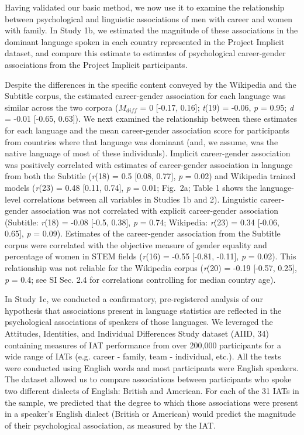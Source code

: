 \documentclass[9pt,twocolumn]{pnas-new}
\begin{document}
Having validated our basic method, we now use it to examine the relationship
between psychological and linguistic associations of men with career and women with family. In Study 1b, we
estimated the magnitude of these associations in the dominant language
spoken in each country represented in the Project Implicit dataset, and
compare this estimate to estimates of psychological career-gender associations from the
Project Implicit participants.



Despite the differences in the specific content conveyed by the
Wikipedia and the Subtitle corpus, the estimated career-gender association for each
language was similar across the two corpora ($M_{diff}$ = 0 {[}-0.17, 0.16{]}; \emph{t}(19) = -0.06, \emph{p} = 0.95; \emph{d} = -0.01 {[}-0.65, 0.63{]}). We next examined the relationship between these
estimates for each language and the mean career-gender association score
for participants from countries where that language was dominant (and,
we assume, was the native language of most of these individuals).
Implicit career-gender association was positively correlated with estimates of
 career-gender association in language from both the Subtitle (\emph{r}(18) = 0.5 {[}0.08, 0.77{]}, \emph{p} = 0.02)
and Wikipedia trained models (\emph{r}(23) = 0.48 {[}0.11, 0.74{]}, \emph{p} = 0.01; Fig.\ 2a;
Table 1 shows the language-level correlations between all variables in
Studies 1b and 2). Linguistic career-gender association was
not correlated with explicit career-gender association (Subtitle: \emph{r}(18) = -0.08 {[}-0.5, 0.38{]}, \emph{p} = 0.74; Wikipedia: \emph{r}(23) = 0.34 {[}-0.06, 0.65{]}, \emph{p} = 0.09). Estimates
of the career-gender association from the Subtitle corpus were correlated with the
objective measure of gender equality and percentage of women in STEM fields
(\emph{r}(16) = -0.55 {[}-0.81, -0.11{]}, \emph{p} = 0.02). This relationship was not reliable
for the Wikipedia corpus (\emph{r}(20) = -0.19 {[}-0.57, 0.25{]}, \emph{p} = 0.4; see SI Sec. 2.4 for correlations controlling for median country age). 




In Study 1c, we conducted a confirmatory, pre-registered analysis of our hypothesis that associations present in language statistics are reflected in the psychological associations of speakers of those languages. We leveraged the Attitudes, Identities, and Individual Differences Study dataset (AIID, 34) containing measures of IAT performance from over 200,000 participants for a wide range of IATs (e.g. career - family, team - individual, etc.). All the tests were conducted using English words and most participants were English speakers. The dataset allowed us to compare associations between participants who spoke two different dialects of English: British and American. For each of the 31 IATs in the sample, we predicted that the degree to which those associations were present in a speaker’s English dialect (British or American) would predict the magnitude of their psychological association, as measured by the IAT.
\end{document}
